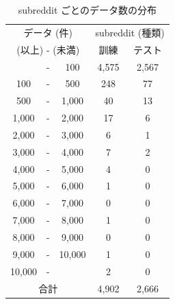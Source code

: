 \begin{table}[tb]
  \caption{subreddit ごとのデータ数の分布}
  \label{tb:1_subreddit_data}
  \centering
  \begin{tabular}{c c c c c} \hline

\multicolumn{3}{c}{データ (件)} & \multicolumn{2}{c}{subreddit (種類)} \\ \cline{4-5}
\multicolumn{3}{c}{(以上) - (未満)} & 訓練 & テスト \\ \hline

& - & 100 & 4,575 & 2,567 \\
100 & - & 500 & 248 & 77 \\
500 & - & 1,000 & 40 & 13 \\
1,000 & - & 2,000 & 17 & 6 \\
2,000 & - & 3,000 & 6 & 1 \\ 
3,000 & - & 4,000 & 7 & 2 \\
4,000 & - & 5,000 & 4 & 0 \\
5,000 & - & 6,000 & 1 & 0 \\
6,000 & - & 7,000 & 0 & 0 \\
7,000 & - & 8,000 & 1 & 0 \\
8,000 & - & 9,000 & 0 & 0 \\
9,000 & - & 10,000 & 1 &  0 \\
10,000 & - & & 2 & 0 \\ \hline
\multicolumn{3}{c}{合計} & 4,902 & 2,666 \\ \hline 

  \end{tabular}
\end{table}





